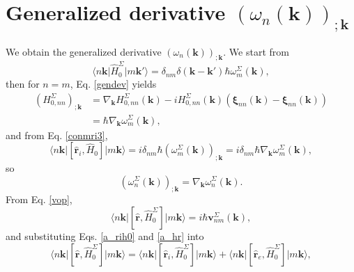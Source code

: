 
\section{Generalized derivative 
\texorpdfstring{$(\omega_{n}(\mathbf{k}))_{;\mathbf{k}}$}{(wn);k}}
\label{app:gwk}

We obtain the generalized derivative $(\omega_{n}(\mathbf{k}))_{;\mathbf{k}}$.
We start from
\begin{equation}\label{a_conH0}
\langle n\mathbf{k}\vert \hat{H}^{\Sigma}_{0} \vert m\mathbf{k}'\rangle
= \delta_{nm}\delta(\mathbf{k}-\mathbf{k}')\hbar\omega^{\Sigma}_{m}(\mathbf{k}),
\end{equation}
then for $n = m$, Eq. \eqref{gendev} yields
\begin{align}\label{a_genderH0}
(H^{\Sigma}_{0,nn})_{;\mathbf{k}}
&= \nabla_{\mathbf{k}}H^{\Sigma}_{0,nn}(\mathbf{k})
 - iH^{\Sigma}_{0,nn}(\mathbf{k})
\left(\boldsymbol{\xi}_{nn}(\mathbf{k})
     -\boldsymbol{\xi}_{nn}(\mathbf{k})\right)\nonumber\\
&= \hbar\nabla_{\mathbf{k}}\omega^{\Sigma}_{m}(\mathbf{k}),
\end{align}
and from Eq. \eqref{conmri3}, 
\begin{equation}\label{a_rih0}
\langle n\mathbf{k}\vert
\left[\hat{\mathbf{r}}_i,\hat{H}_{0}\right]
\vert m\mathbf{k}\rangle
= i\delta_{nm}\hbar(\omega^{\Sigma}_{m}(\mathbf{k}))_{;\mathbf{k}}
= i\delta_{nm}\hbar\nabla_{\mathbf{k}}\omega^{\Sigma}_{m}(\mathbf{k}),
\end{equation}
so
\begin{equation}\label{a_wgendev}
\left(\omega^{\Sigma}_{n}(\mathbf{k})\right)_{;\mathbf{k}}
= \nabla_{\mathbf{k}}\omega^{\Sigma}_{n}(\mathbf{k}).
\end{equation}
From Eq. \eqref{vop},
\begin{equation}\label{a_hr}
\langle n\mathbf{k}\vert
\left[\hat{\mathbf{r}},\hat{H}^{\Sigma}_{0}\right]
\vert m\mathbf{k}\rangle
= i\hbar\mathbf{v}^{\Sigma}_{nm}(\mathbf{k}),
\end{equation}
and substituting Eqs. \eqref{a_rih0} and \eqref{a_hr} into
\begin{equation}\label{a_hrt}
\langle n\mathbf{k}\vert
\left[\hat{\mathbf{r}},\hat{H}^{\Sigma}_{0}\right]
\vert m\mathbf{k}\rangle 
= \langle n\mathbf{k}\vert
  \left[\hat{\mathbf{r}}_i,\hat{H}^{\Sigma}_{0}\right]
  \vert m\mathbf{k}\rangle
+ \langle n\mathbf{k}\vert
  \left[\hat{\mathbf{r}}_e,\hat{H}^{\Sigma}_{0}\right]
  \vert m\mathbf{k}\rangle,
\end{equation}
